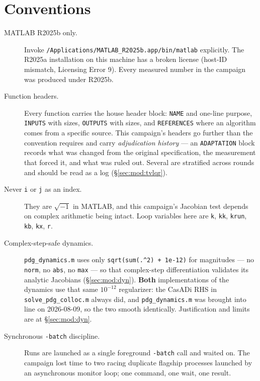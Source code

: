 \documentclass[11pt]{article}
\newcommand{\file}[1]{\texttt{#1}}
\begin{document}
\section{Conventions}
\label{sec:conventions}

\begin{description}

\item[MATLAB R2025b only.] Invoke
\texttt{/Applications/MATLAB\_R2025b.app/bin/matlab} explicitly. The R2025a
installation on this machine has a broken license (host-ID mismatch,
Licensing Error 9). Every measured number in the campaign was produced under
R2025b.

\item[Function headers.] Every function carries the house header block:
\texttt{NAME} and one-line purpose, \texttt{INPUTS} with sizes,
\texttt{OUTPUTS} with sizes, and \texttt{REFERENCES} where an algorithm
comes from a specific source. This campaign's headers go further than the
convention requires and carry \emph{adjudication history} --- an
\texttt{ADAPTATION} block records what was changed from the original
specification, the measurement that forced it, and what was ruled out.
Several are stratified across rounds and should be read as a log
(\S\ref{sec:mod:tvlqr}).

\item[Never \texttt{i} or \texttt{j} as an index.] They are $\sqrt{-1}$ in
MATLAB, and this campaign's Jacobian test depends on complex arithmetic
being intact. Loop variables here are \texttt{k}, \texttt{kk},
\texttt{krun}, \texttt{kb}, \texttt{kx}, \texttt{r}.

\item[Complex-step-safe dynamics.] \file{pdg\_dynamics.m} uses only
\texttt{sqrt(sum(.\^{}2) + 1e-12)} for magnitudes --- no \texttt{norm}, no
\texttt{abs}, no \texttt{max} --- so that complex-step differentiation
validates its analytic Jacobians (\S\ref{sec:mod:dyn}). \textbf{Both}
implementations of the dynamics use that same $10^{-12}$ regularizer: the
CasADi RHS in \file{solve\_pdg\_colloc.m} always did, and
\file{pdg\_dynamics.m} was brought into line on 2026-08-09, so the two
smooth identically. Justification and limits are at \S\ref{sec:mod:dyn}.

\item[Synchronous \texttt{-batch} discipline.] Runs are launched as a single
foreground \texttt{-batch} call and waited on. The campaign lost time to two
racing duplicate flagship processes launched by an asynchronous monitor
loop; one command, one wait, one result.


\end{description}
\end{document}
